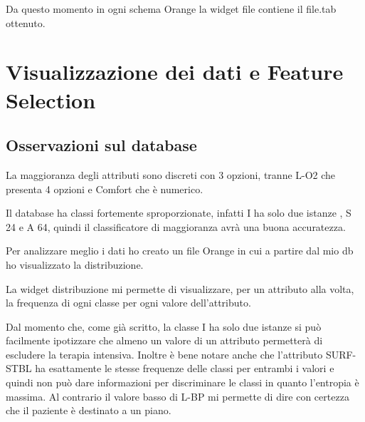 \documentclass[a4paper, 12p]{report}
\begin{document}
\noindent Da questo momento in ogni schema Orange la widget file contiene il file.tab ottenuto.

\section{Visualizzazione dei dati e Feature Selection}

\subsection{Osservazioni sul database}

La maggioranza degli attributi sono discreti con 3 opzioni, tranne L-O2 che presenta 4 opzioni e Comfort che è numerico.

\noindent Il database ha classi fortemente sproporzionate, infatti I ha solo due istanze , S 24 e A 64, quindi il classificatore di maggioranza avrà una buona accuratezza.

\noindent Per analizzare meglio i dati ho creato un  file Orange in cui a partire dal mio db ho visualizzato la distribuzione.

La widget distribuzione mi permette di visualizzare, per un attributo alla volta, la frequenza di ogni classe per ogni valore dell'attributo. 

\noindent Dal momento che, come già scritto, la classe I ha solo due istanze si può facilmente ipotizzare che almeno un valore di un attributo permetterà di escludere la terapia intensiva. Inoltre è bene notare anche che l'attributo SURF-STBL ha esattamente le stesse frequenze delle classi per entrambi i valori e quindi non può dare informazioni per discriminare le classi in quanto l'entropia è massima. Al contrario il valore basso di L-BP mi permette di dire con certezza che il paziente è destinato a un piano.
\end{document}
